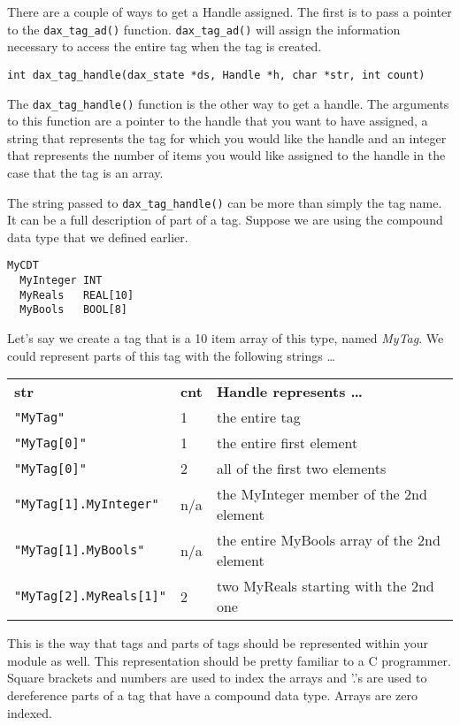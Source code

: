 There are a couple of ways to get a Handle assigned.  The first is to pass a pointer to the \verb|dax_tag_ad()| function.  \verb|dax_tag_ad()| will assign the information necessary to access the entire tag when the tag is created.

\verb|int dax_tag_handle(dax_state *ds, Handle *h, char *str, int count)|

The \verb|dax_tag_handle()| function  is the other way to get a handle.  The arguments to this function are a pointer to the handle that you want to have assigned, a string that represents the tag for which you would like the handle and an integer that represents the number of items you would like assigned to the handle in the case that the tag is an array.

The string passed to \verb|dax_tag_handle()| can be more than simply the tag name.  It can be a full description of part of a tag.  Suppose we are using the compound data type that we defined earlier.

\begin{verbatim}
MyCDT
  MyInteger INT
  MyReals   REAL[10]
  MyBools   BOOL[8]
\end{verbatim}

Let's say we create a tag that is a 10 item array of this type, named \emph{MyTag}.  We could represent parts of this tag with the following strings \ldots

\begin{tabular}{lll}
\textbf{str} & \textbf{cnt} & \textbf{Handle represents \ldots} \\
\verb|"MyTag"| & 1 & the entire tag \\ 
\verb|"MyTag[0]"| & 1 & the entire first element \\ 
\verb|"MyTag[0]"| & 2 & all of the first two elements \\ 
\verb|"MyTag[1].MyInteger"| & n/a & the MyInteger member of the 2nd element \\ 
\verb|"MyTag[1].MyBools"| & n/a & the entire MyBools array of the 2nd element \\ 
\verb|"MyTag[2].MyReals[1]"| & 2 & two MyReals starting with the 2nd one \\ 
\end{tabular} 

This is the way that tags and parts of tags should be represented within your module as well.  This representation should be pretty familiar to a C programmer.  Square brackets and numbers are used to index the arrays and '.'s are used to dereference parts of a tag that have a compound data type.  Arrays are zero indexed.

